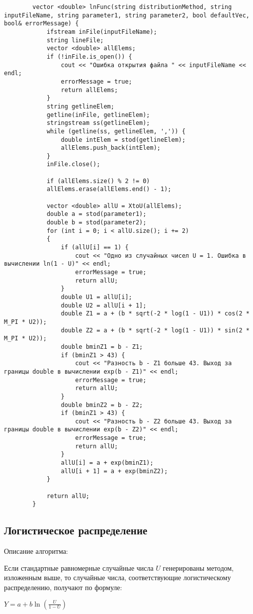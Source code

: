 \documentclass[bachelor, och, coursework]{shiza}
\begin{document}
	\begin{verbatim}
		vector <double> lnFunc(string distributionMethod, string inputFileName, string parameter1, string parameter2, bool defaultVec, bool& errorMessage) {
			ifstream inFile(inputFileName);
			string lineFile;
			vector <double> allElems;
			if (!inFile.is_open()) {
				cout << "Ошибка открытия файла " << inputFileName << endl;
				errorMessage = true;
				return allElems;
			}
			string getlineElem;
			getline(inFile, getlineElem);
			stringstream ss(getlineElem);
			while (getline(ss, getlineElem, ',')) {
				double intElem = stod(getlineElem);
				allElems.push_back(intElem);
			}
			inFile.close();
			
			if (allElems.size() % 2 != 0)
			allElems.erase(allElems.end() - 1);
			
			vector <double> allU = XtoU(allElems);
			double a = stod(parameter1);
			double b = stod(parameter2);
			for (int i = 0; i < allU.size(); i += 2)
			{
				if (allU[i] == 1) {
					cout << "Одно из случайных чисел U = 1. Ошибка в вычислении ln(1 - U)" << endl;
					errorMessage = true;
					return allU;
				}
				double U1 = allU[i];
				double U2 = allU[i + 1];
				double Z1 = a + (b * sqrt(-2 * log(1 - U1)) * cos(2 * M_PI * U2));
				double Z2 = a + (b * sqrt(-2 * log(1 - U1)) * sin(2 * M_PI * U2));
				double bminZ1 = b - Z1;
				if (bminZ1 > 43) {
					cout << "Разность b - Z1 больше 43. Выход за границы double в вычислении exp(b - Z1)" << endl;
					errorMessage = true;
					return allU;
				}
				double bminZ2 = b - Z2;
				if (bminZ1 > 43) {
					cout << "Разность b - Z2 больше 43. Выход за границы double в вычислении exp(b - Z2)" << endl;
					errorMessage = true;
					return allU;
				}
				allU[i] = a + exp(bminZ1);
				allU[i + 1] = a + exp(bminZ2);
			}
			
			return allU;
		}
	\end{verbatim}

	
	\subsection{Логистическое распределение}

	Описание алгоритма:

	Если стандартные равномерные случайные числа $U$ генерированы методом, изложенным выше, то случайные числа, соответствующие логистическому распределению, получают по формуле:
	
	\begin{center}
		$Y = a + b \ln(\frac{U}{1 - U})$
	\end{center}
	
\end{document}
